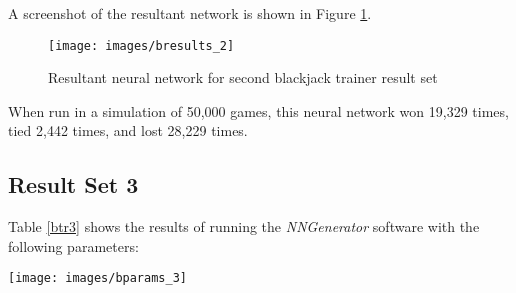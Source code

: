A screenshot of the resultant network is shown in Figure \ref{bresults_2}.

\begin{figure}[h!]
  \centering
  \texttt{[image: images/bresults\_2]}
  \caption{Resultant neural network for second blackjack trainer result set}
  \label{bresults_2}
\end{figure}

When run in a simulation of 50,000 games, this neural network won 19,329
times, tied 2,442 times, and lost 28,229 times.

\subsection{Result Set 3}
Table \ref{btr3} shows the results of running the {\it NNGenerator} software with the following parameters:

\begin{center}
\texttt{[image: images/bparams\_3]}
\end{center}

